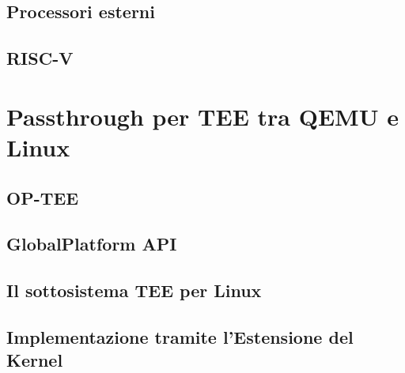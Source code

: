 \documentclass[12pt,italian]{report}
\begin{document}
\section{Processori esterni}
\label{sec:processori-esterni}

\section{RISC-V}
\label{sec:risc-v}


\chapter{Passthrough per TEE tra QEMU e Linux}
\label{chap:passthrough-tee-qemu-linux}

\section{OP-TEE}
\label{sec:architettura-op-tee}

\section{GlobalPlatform API}
\label{sec:global-platform-api}

\section{Il sottosistema TEE per Linux}
\label{sec:sottosistema-tee-per-linux}

\section{Implementazione tramite l'Estensione del Kernel}
\label{sec:implementazione-passthrough-tramite-kernel-module}
\end{document}
